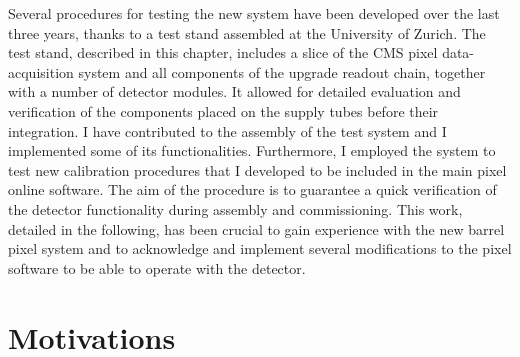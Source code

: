 Several procedures for testing the new system have been developed over the last three years, thanks to a test stand assembled at the University of Zurich. The test stand, described in this chapter, includes a slice of the CMS pixel data-acquisition system and all components of the upgrade readout chain, together with a number of detector modules. It allowed for detailed evaluation and verification of the components placed on the supply tubes before their integration.
I have contributed to the assembly of the test system and I implemented some of its functionalities. Furthermore, I employed the system to test new calibration procedures that I developed to be included in the main pixel online software. The aim of the procedure is to guarantee a quick verification of the detector functionality during assembly and commissioning. This work, detailed in the following, has been crucial to gain experience with the new barrel pixel system and to acknowledge and implement several modifications to the pixel software to be able to operate with the detector.

\section{Motivations}


